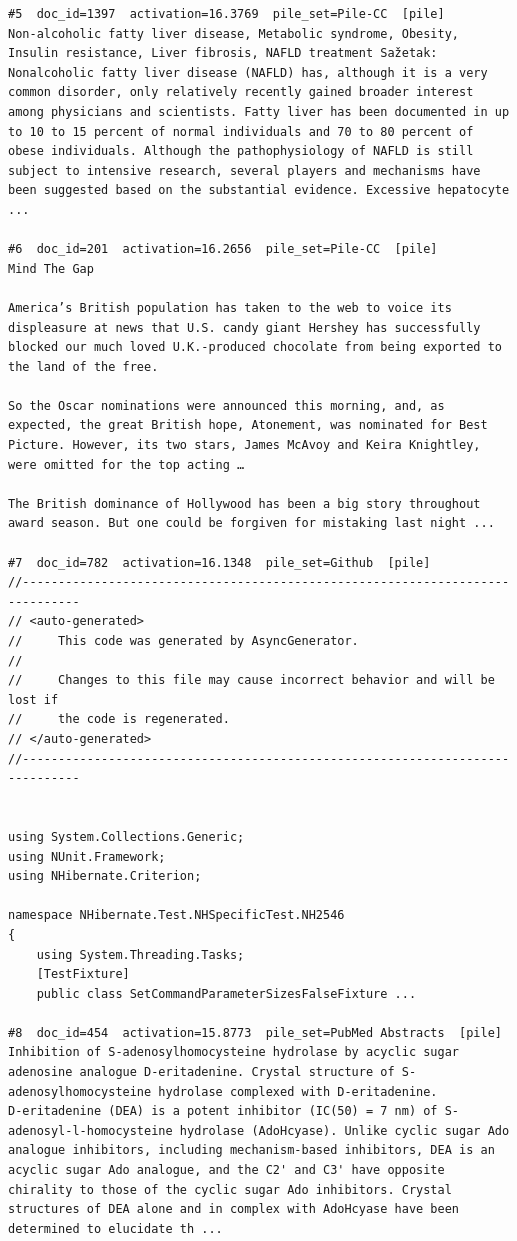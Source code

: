 \begin{verbatim}
#5  doc_id=1397  activation=16.3769  pile_set=Pile-CC  [pile]
Non-alcoholic fatty liver disease, Metabolic syndrome, Obesity, Insulin resistance, Liver fibrosis, NAFLD treatment Sažetak: Nonalcoholic fatty liver disease (NAFLD) has, although it is a very common disorder, only relatively recently gained broader interest among physicians and scientists. Fatty liver has been documented in up to 10 to 15 percent of normal individuals and 70 to 80 percent of obese individuals. Although the pathophysiology of NAFLD is still subject to intensive research, several players and mechanisms have been suggested based on the substantial evidence. Excessive hepatocyte ...

#6  doc_id=201  activation=16.2656  pile_set=Pile-CC  [pile]
Mind The Gap

America’s British population has taken to the web to voice its displeasure at news that U.S. candy giant Hershey has successfully blocked our much loved U.K.-produced chocolate from being exported to the land of the free.

So the Oscar nominations were announced this morning, and, as expected, the great British hope, Atonement, was nominated for Best Picture. However, its two stars, James McAvoy and Keira Knightley, were omitted for the top acting …

The British dominance of Hollywood has been a big story throughout award season. But one could be forgiven for mistaking last night ...

#7  doc_id=782  activation=16.1348  pile_set=Github  [pile]
﻿//------------------------------------------------------------------------------
// <auto-generated>
//     This code was generated by AsyncGenerator.
//
//     Changes to this file may cause incorrect behavior and will be lost if
//     the code is regenerated.
// </auto-generated>
//------------------------------------------------------------------------------


using System.Collections.Generic;
using NUnit.Framework;
using NHibernate.Criterion;

namespace NHibernate.Test.NHSpecificTest.NH2546
{
	using System.Threading.Tasks;
	[TestFixture]
	public class SetCommandParameterSizesFalseFixture ...

#8  doc_id=454  activation=15.8773  pile_set=PubMed Abstracts  [pile]
Inhibition of S-adenosylhomocysteine hydrolase by acyclic sugar adenosine analogue D-eritadenine. Crystal structure of S-adenosylhomocysteine hydrolase complexed with D-eritadenine.
D-eritadenine (DEA) is a potent inhibitor (IC(50) = 7 nm) of S-adenosyl-l-homocysteine hydrolase (AdoHcyase). Unlike cyclic sugar Ado analogue inhibitors, including mechanism-based inhibitors, DEA is an acyclic sugar Ado analogue, and the C2' and C3' have opposite chirality to those of the cyclic sugar Ado inhibitors. Crystal structures of DEA alone and in complex with AdoHcyase have been determined to elucidate th ...


\end{verbatim}
